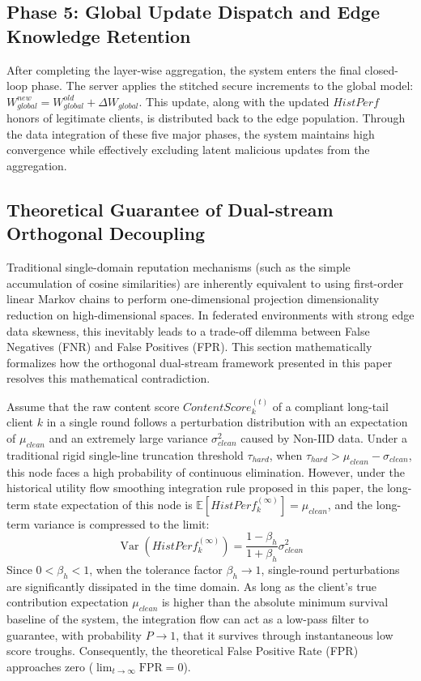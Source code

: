 \documentclass[runningheads]{llncs}
\begin{document}
\subsection{Phase 5: Global Update Dispatch and Edge Knowledge Retention}
After completing the layer-wise aggregation, the system enters the final closed-loop phase. The server applies the stitched secure increments to the global model: $W_{global}^{new} = W_{global}^{old} + \Delta W_{global}$. This update, along with the updated $HistPerf$ honors of legitimate clients, is distributed back to the edge population. Through the data integration of these five major phases, the system maintains high convergence while effectively excluding latent malicious updates from the aggregation.

\subsection{Theoretical Guarantee of Dual-stream Orthogonal Decoupling}
Traditional single-domain reputation mechanisms (such as the simple accumulation of cosine similarities) are inherently equivalent to using first-order linear Markov chains to perform one-dimensional projection dimensionality reduction on high-dimensional spaces. In federated environments with strong edge data skewness, this inevitably leads to a trade-off dilemma between False Negatives (FNR) and False Positives (FPR). This section mathematically formalizes how the orthogonal dual-stream framework presented in this paper resolves this mathematical contradiction.

\begin{lemma}
Assume that the raw content score $ContentScore_{k}^{(t)}$ of a compliant long-tail client $k$ in a single round follows a perturbation distribution with an expectation of $\mu_{clean}$ and an extremely large variance $\sigma_{clean}^2$ caused by Non-IID data. Under a traditional rigid single-line truncation threshold $\tau_{hard}$, when $\tau_{hard} > \mu_{clean} - \sigma_{clean}$, this node faces a high probability of continuous elimination. However, under the historical utility flow smoothing integration rule proposed in this paper, the long-term state expectation of this node is $\mathbb{E}[HistPerf_k^{(\infty)}] = \mu_{clean}$, and the long-term variance is compressed to the limit:
\begin{equation}
    \operatorname{Var}(HistPerf_{k}^{(\infty)}) = \frac{1-\beta_h}{1+\beta_h} \sigma_{clean}^{2}
\end{equation}
Since $0 < \beta_h < 1$, when the tolerance factor $\beta_h \to 1$, single-round perturbations are significantly dissipated in the time domain. As long as the client's true contribution expectation $\mu_{clean}$ is higher than the absolute minimum survival baseline of the system, the integration flow can act as a low-pass filter to guarantee, with probability $P \to 1$, that it survives through instantaneous low score troughs. Consequently, the theoretical False Positive Rate (FPR) approaches zero ($\lim_{t \to \infty} \text{FPR} = 0$).
\end{lemma}
\end{document}
